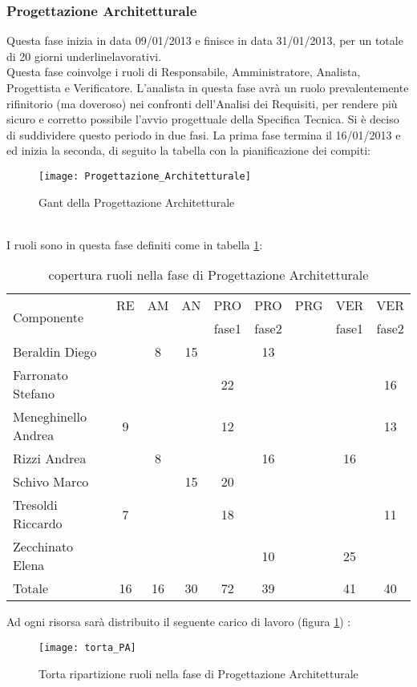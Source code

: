 \subsubsection{Progettazione Architetturale}
Questa fase inizia in data 09/01/2013 e finisce in data 31/01/2013, per un totale di 20 giorni underline{lavorativi}. \\
Questa fase coinvolge i ruoli di Responsabile, Amministratore, Analista, Progettista e Verificatore.
L'analista in questa fase avrà un ruolo prevalentemente rifinitorio (ma doveroso) nei confronti dell'Analisi dei Requisiti, per rendere più sicuro e corretto possibile l'avvio progettuale della Specifica Tecnica.
Si è deciso di suddividere questo periodo in due fasi. La prima fase termina il 16/01/2013 e ed inizia la seconda, di seguito la tabella con la pianificazione dei compiti:\\
\begin{figure}[h]
  \texttt{[image: Progettazione\_Architetturale]}
\caption{Gant della Progettazione Architetturale }
\end{figure}\\
I ruoli sono in questa fase definiti come in tabella \ref{tab:ruoliprog}:\\
\begin{table}[h]
\centering
\begin{tabular}{|l|c|c|c|c|c|c|c|c|}
\hline
\multirow{2}{*}{Componente}& RE& AM& AN& PRO& PRO& PRG& VER& VER\\
                    &    &      &      &fase1          &fase2         &        &fase1	 &fase2\\ 
\hline
Beraldin Diego & & 8& 15& & 13& & &\\
Farronato Stefano & & & & 22& & & & 16\\
Meneghinello Andrea & 9& & & 12& & & & 13\\
Rizzi Andrea & & 8& & & 16& & 16& \\
Schivo Marco & & & 15& 20& & & & \\
Tresoldi Riccardo & 7& & & 18& & & & 11\\
Zecchinato Elena & & & & & 10& & 25& \\
\hline
Totale & 16& 16& 30& 72& 39& & 41& 40\\
\hline
\end{tabular}
\caption{copertura ruoli nella fase di Progettazione Architetturale}\label{tab:ruoliprog}
\end{table}
\clearpage
Ad ogni risorsa sarà distribuito il seguente carico di lavoro (figura \ref{fig:ruoliprog}) :\\
\begin{figure}[h!]
\centering
\texttt{[image: torta\_PA]}
\caption{Torta ripartizione ruoli nella fase di Progettazione Architetturale}\label{fig:ruoliprog}
\end{figure}\\

